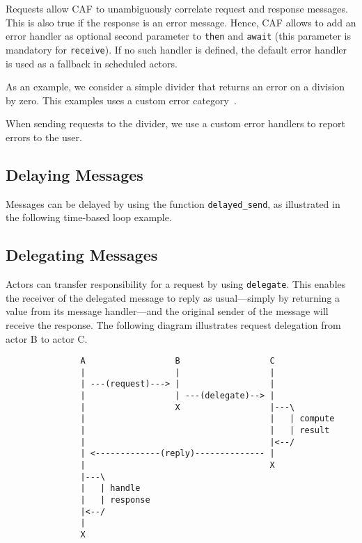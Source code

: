 Requests allow CAF to unambiguously correlate request and response messages.
This is also true if the response is an error message. Hence, CAF allows to
add an error handler as optional second parameter to \lstinline^then^ and
\lstinline^await^ (this parameter is mandatory for \lstinline^receive^). If no
such handler is defined, the default error handler  is used
as a fallback in scheduled actors.

As an example, we consider a simple divider that returns an error on a division
by zero. This examples uses a custom error category~.


When sending requests to the divider, we use a custom error handlers to report
errors to the user.


\clearpage
\subsection{Delaying Messages}
\label{delay-message}

Messages can be delayed by using the function \lstinline^delayed_send^, as
illustrated in the following time-based loop example.


\clearpage
\subsection{Delegating Messages}
\label{delegate}

Actors can transfer responsibility for a request by using \lstinline^delegate^.
This enables the receiver of the delegated message to reply as usual---simply
by returning a value from its message handler---and the original sender of the
message will receive the response. The following diagram illustrates request
delegation from actor B to actor C.

\begin{footnotesize}
\begin{verbatim}
               A                  B                  C
               |                  |                  |
               | ---(request)---> |                  |
               |                  | ---(delegate)--> |
               |                  X                  |---\
               |                                     |   | compute
               |                                     |   | result
               |                                     |<--/
               | <-------------(reply)-------------- |
               |                                     X
               |---\
               |   | handle
               |   | response
               |<--/
               |
               X
\end{verbatim}
\end{footnotesize}

